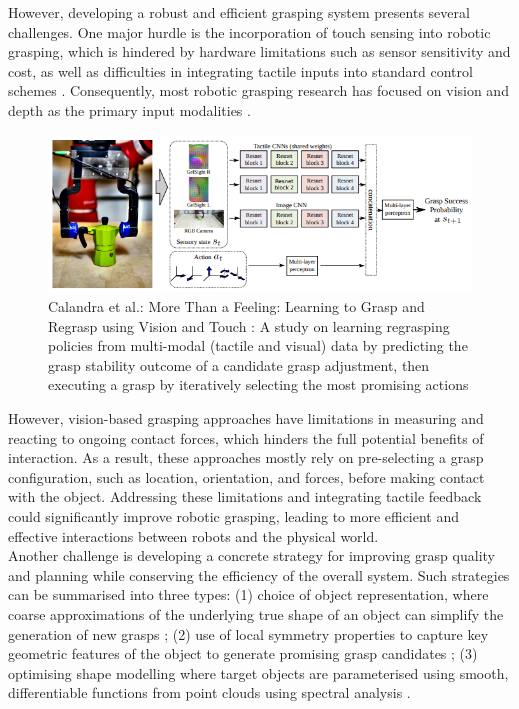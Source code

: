 \documentclass[11pt, a4paper]{report}
\begin{document}
However, developing a robust and efficient grasping system presents several challenges. One major hurdle is the incorporation of touch sensing into robotic grasping, which is hindered by hardware limitations such as sensor sensitivity and cost, as well as difficulties in integrating tactile inputs into standard control schemes \cite{Calandra_2018}. Consequently, most robotic grasping research has focused on vision and depth as the primary input modalities \cite{Calandra_2018, de_Farias_2021}.
\begin{figure}[ht]
    \centering
    \includegraphics[width=\textwidth]{docs/Project Report/Media/calandra_2018_model.png}
    \caption{Calandra et al.: More Than a Feeling: Learning to Grasp and Regrasp using Vision and Touch \cite{Calandra_2018}: A study on learning regrasping policies from multi-modal (tactile and visual) data by predicting the grasp stability outcome of a candidate grasp adjustment, then executing a grasp by iteratively selecting the most promising actions}
    \label{fig:1.2}
\end{figure}

However, vision-based grasping approaches have limitations in measuring and reacting to ongoing contact forces, which hinders the full potential benefits of interaction. As a result, these approaches mostly rely on pre-selecting a grasp configuration, such as location, orientation, and forces, before making contact with the object. Addressing these limitations and integrating tactile feedback could significantly improve robotic grasping, leading to more efficient and effective interactions between robots and the physical world.\\

Another challenge is developing a concrete strategy for improving grasp quality and planning while conserving the efficiency of the overall system. Such strategies can be summarised into three types: (1) choice of object representation, where coarse approximations of the underlying true shape of an object can simplify the generation of new grasps \cite{de_Farias_2021} \cite{geidenstam_2009}; (2) use of local symmetry properties to capture key geometric features of the object to generate promising grasp candidates \cite{de_Farias_2021}; (3) optimising shape modelling where target objects are parameterised using smooth, differentiable functions from point clouds using spectral analysis \cite{de_Farias_2021}.
\end{document}
